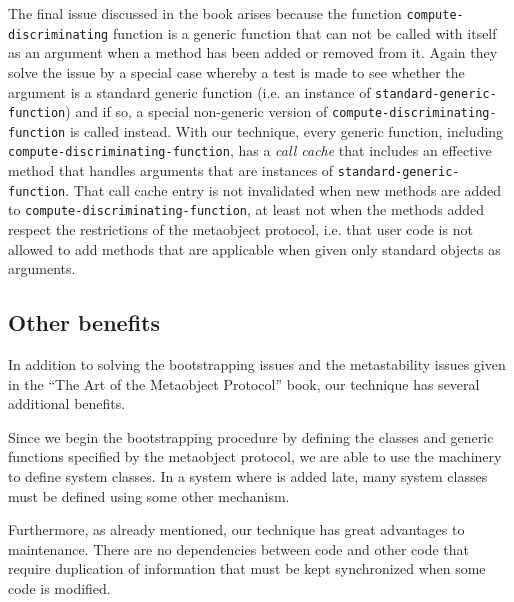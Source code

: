 The final issue discussed in the book arises because the function
\texttt{compute-discriminating} function is a generic function that
can not be called with itself as an argument when a method has been
added or removed from it.  Again they solve the issue by a special
case whereby a test is made to see whether the argument is a standard
generic function (i.e. an instance of
\texttt{standard-generic-function}) and if so, a special non-generic
version of \texttt{compute-discriminating-function} is called instead.
With our technique, every generic function, including
\texttt{compute-discriminating-function}, has a \emph{call cache} that
includes an effective method that handles arguments that are instances
of \texttt{standard-generic-function}.  That call cache entry is not
invalidated when new methods are added to
\texttt{compute-discriminating-function}, at least not when the
methods added respect the restrictions of the metaobject protocol,
i.e. that user code is not allowed to add methods that are applicable
when given only standard objects as arguments.

\subsection{Other benefits}

In addition to solving the bootstrapping issues and the metastability
issues given in the ``The Art of the Metaobject Protocol'' book, our
technique has several additional benefits.

Since we begin the bootstrapping procedure by
defining the classes and generic functions specified by the metaobject
protocol, we are able to use the \clos{} machinery to define system
classes.  In a system where \clos{} is added late, many system classes
must be defined using some other mechanism.

Furthermore, as already mentioned, our technique has great advantages
to maintenance.  There are no dependencies between \clos{} code and
other code that require duplication of information that must be kept
synchronized when some code is modified.
